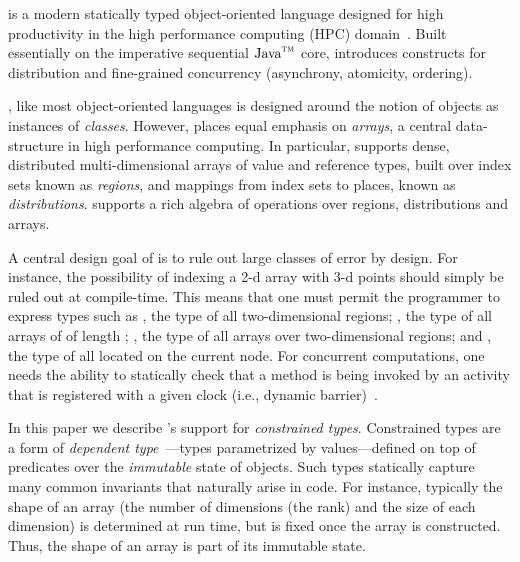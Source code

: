 
%

%
%
%

\Xten{} is a modern statically typed object-oriented
language designed for high productivity in the high performance
computing (HPC) domain~\cite{X10}. Built essentially on the
imperative sequential $\mbox{Java}^{\mbox{\scriptsize\sc tm}}$
core, \Xten{} introduces constructs for distribution and
fine-grained concurrency (asynchrony, atomicity, ordering).

\Xten{}, like most object-oriented languages is designed around
the notion of objects as instances of {\em classes}. However, \Xten{}
places equal emphasis on {\em arrays}, a central data-structure in
high performance computing. In particular, \Xten{} supports dense,
distributed multi-dimensional arrays of value and reference types,
built over index sets known as {\em regions}, and mappings from index
sets to places, known as {\em distributions}.  \Xten{} supports a rich
algebra of operations over regions, distributions and arrays.

A central design goal of \Xten{} is to rule out large classes of error
by design. For instance, the possibility of indexing a 2-d array with 3-d
points should simply be ruled out at compile-time. This means that one
must permit the programmer to express types such as ,
the type of all two-dimensional regions; , the
type of all arrays of  of length ; , the type of all  arrays over two-dimensional regions; and
, the type of all  located on the
current node. For concurrent computations, one needs the ability to
statically check that a method is being invoked by an activity that is
registered with a given clock (i.e., dynamic barrier)~\cite{X10}.

In this paper we describe {\Xten}'s support for {\em
constrained types}.  
Constrained types are a form of {\em dependent
type}~\cite{dependent-types,xi99dependent,ocrz-ecoop03,aspinall-attapl,cayenne,epigram-matter,calc-constructions}---types parametrized by values---defined 
on top of predicates over the {\em immutable}
state of objects. Such types statically capture many common invariants
that naturally arise in code. For instance, typically the shape of an
array (the number of dimensions (the rank) and the size of each dimension)
is determined at
run time, but is fixed once the array is constructed. Thus, the shape of an
array is part of its immutable state.


